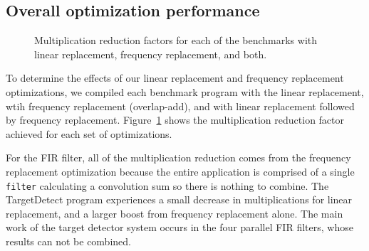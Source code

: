\subsection{Overall optimization performance}



\begin{figure}
\center
\epsfxsize=3.2in
\vspace{-6pt}
\caption{Multiplication reduction factors for each of the benchmarks with linear replacement, frequency replacement, and both.}
\label{fig:linear-freq-both}
\vspace{-12pt}
\end{figure}

To determine the effects of our linear replacement and frequency replacement 
optimizations, we compiled each benchmark program with the linear 
replacement, wtih frequency replacement (overlap-add),
and with linear replacement followed by frequency replacement. 
Figure~\ref{fig:linear-freq-both} shows the multiplication reduction factor 
achieved for each set of optimizations.

For the FIR filter, all of the multiplication reduction comes from the frequency
replacement optimization because the entire application is comprised of a single
{\tt filter} calculating a convolution sum so there is nothing to combine.
The TargetDetect program experiences a small decrease in multiplications 
for linear replacement, and a larger boost from frequency replacement alone.
The main work of the target detector system occurs in the four parallel FIR filters, whose
results can not be combined.


